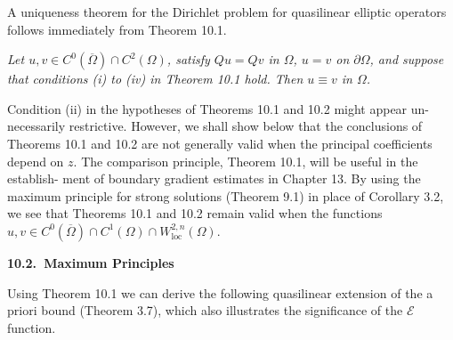 A uniqueness theorem for the Dirichlet problem for quasilinear elliptic
operators follows immediately from Theorem 10.1.

\medskip

\begin{theorem}\label{gilbarg-trudinger.thm.10.2.dirichlet-uniqueness}
\textit{Let $u, v \in C^0(\overline{\Omega}) \cap C^2(\Omega)$, satisfy $Qu = Qv$ in $\Omega$, $u = v$ on $\partial \Omega$,
and suppose that conditions (i) to (iv) in Theorem 10.1 hold. Then $u \equiv v$ in $\Omega$.}
\end{theorem}

\medskip

Condition (ii) in the hypotheses of Theorems 10.1 and 10.2 might appear un-
necessarily restrictive. However, we shall show below that the conclusions of
Theorems 10.1 and 10.2 are not generally valid when the principal coefficients
depend on $z$. The comparison principle, Theorem 10.1, will be useful in the establish-
ment of boundary gradient estimates in Chapter 13.
By using the maximum principle for strong solutions (Theorem 9.1) in place of
Corollary 3.2, we see that Theorems 10.1 and 10.2 remain valid when the functions
$u, v \in C^0(\overline{\Omega}) \cap C^1(\Omega) \cap W^{2,n}_{\mathrm{loc}}(\Omega)$.

\medskip

\noindent\textbf{10.2.\ Maximum Principles}

\medskip

Using Theorem 10.1 we can derive the following quasilinear extension of the a priori
bound (Theorem 3.7), which also illustrates the significance of the $\mathcal{E}$ function.

\medskip

